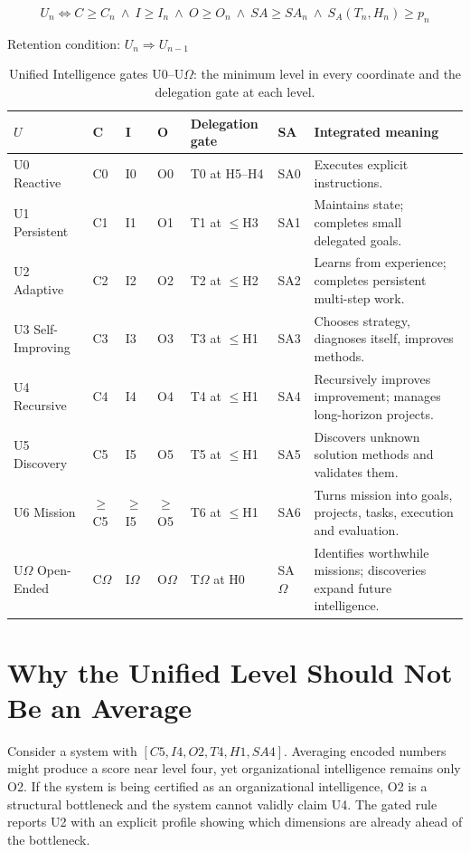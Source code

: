 \documentclass[11pt]{article}
\theoremstyle{definition}
\newcommand{\Om}{\ensuremath{\Omega}}
\begin{document}
\begin{equation}
U_n \iff C \ge C_n \ \wedge\ I \ge I_n \ \wedge\ O \ge O_n \ \wedge\ SA \ge SA_n \ \wedge\ S_A(T_n,H_n) \ge p_n
\end{equation}
\begin{center}Retention condition: $U_n \Rightarrow U_{n-1}$\end{center}

\begin{table}[H]
\centering\small
\begin{tabularx}{\textwidth}{@{}llllllY@{}}
\toprule
$U$ & C & I & O & Delegation gate & SA & Integrated meaning \\
\midrule
U0 Reactive & C0 & I0 & O0 & T0 at H5--H4 & SA0 & Executes explicit instructions. \\
U1 Persistent & C1 & I1 & O1 & T1 at $\le$H3 & SA1 & Maintains state; completes small delegated goals. \\
U2 Adaptive & C2 & I2 & O2 & T2 at $\le$H2 & SA2 & Learns from experience; completes persistent multi-step work. \\
U3 Self-Improving & C3 & I3 & O3 & T3 at $\le$H1 & SA3 & Chooses strategy, diagnoses itself, improves methods. \\
U4 Recursive & C4 & I4 & O4 & T4 at $\le$H1 & SA4 & Recursively improves improvement; manages long-horizon projects. \\
U5 Discovery & C5 & I5 & O5 & T5 at $\le$H1 & SA5 & Discovers unknown solution methods and validates them. \\
U6 Mission & $\ge$C5 & $\ge$I5 & $\ge$O5 & T6 at $\le$H1 & SA6 & Turns mission into goals, projects, tasks, execution and evaluation. \\
U\Om{} Open-Ended & C\Om{} & I\Om{} & O\Om{} & T\Om{} at H0 & SA\Om{} & Identifies worthwhile missions; discoveries expand future intelligence. \\
\bottomrule
\end{tabularx}
\caption{Unified Intelligence gates U0--U\Om{}: the minimum level in every coordinate and the delegation gate at each level.}
\label{tab:ugates}
\end{table}

\section{Why the Unified Level Should Not Be an Average}

Consider a system with $[C5, I4, O2, T4, H1, SA4]$. Averaging encoded numbers might produce a score near level four, yet organizational intelligence remains only O2. If the system is being certified as an organizational intelligence, O2 is a structural bottleneck and the system cannot validly claim U4. The gated rule reports U2 with an explicit profile showing which dimensions are already ahead of the bottleneck.
\end{document}
